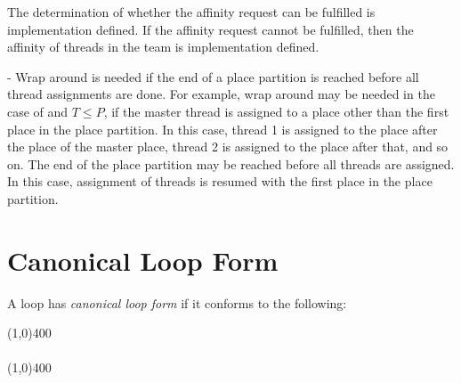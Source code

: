 The determination of whether the affinity request can be fulfilled is implementation defined. If the affinity request cannot be fulfilled, then the affinity of threads in the team is implementation defined.

\notestart
\noteheader - Wrap around is needed if the end of a place partition is reached before all thread assignments are done. For example, wrap around may be needed in the case of  and $T\leq P$, if the master thread is assigned to a place other than the first place in the place partition. In this case, thread 1 is assigned to the place after the place of the master place, thread 2 is assigned to the place after that, and so on. The end of the place partition may be reached before all threads are assigned. In this case, assignment of threads is resumed with the first place in the place partition.
\noteend


\section{Canonical Loop Form}
\label{sec:Canonical Loop Form}
\ccppspecificstart
A loop has \emph{canonical loop form} if it conforms to the following:

\nolinenumbers\line(1,0){400}\\
\\[-2ex]
\line(1,0){400}\linenumbers

